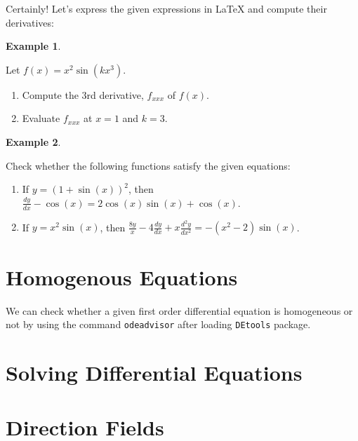 \documentclass[
]{book}
\providecommand{\tightlist}{%
  \setlength{\itemsep}{0pt}\setlength{\parskip}{0pt}}
\theoremstyle{definition}
\theoremstyle{definition}
\newtheorem{example}{Example}[chapter]
\theoremstyle{definition}
\theoremstyle{definition}
\theoremstyle{remark}
\begin{document}
Certainly! Let's express the given expressions in LaTeX and compute their derivatives:

\begin{example}
\protect\hypertarget{exm:unnamed-chunk-37}{}\label{exm:unnamed-chunk-37}

Let \(f(x) = x^2 \sin(kx^3)\).

\begin{enumerate}
\def\labelenumi{(\roman{enumi})}
\tightlist
\item
  Compute the 3rd derivative, \(f_{xxx}\) of \(f(x)\).
\item
  Evaluate \(f_{xxx}\) at \(x = 1\) and \(k = 3\).
\end{enumerate}

\end{example}

\begin{example}
\protect\hypertarget{exm:unnamed-chunk-38}{}\label{exm:unnamed-chunk-38}

Check whether the following functions satisfy the given equations:

\begin{enumerate}
\def\labelenumi{(\roman{enumi})}
\tightlist
\item
  If \(y = {(1 + \sin(x))^2}\), then \(\frac{dy}{dx} - \cos(x) = 2\cos(x)\sin(x) + \cos(x)\).
\item
  If \(y = x^2 \sin(x)\), then \(\frac{8y}{x} - 4\frac{dy}{dx} + x\frac{d^2y}{dx^2} = -(x^2 - 2)\sin(x)\).
\end{enumerate}

\end{example}

\section{Homogenous Equations}\label{homogenous-equations}

We can check whether a given first order differential equation is homogeneous or not by using the command \texttt{odeadvisor} after loading \texttt{DEtools} package.

\section{Solving Differential Equations}\label{solving-differential-equations}

\section{Direction Fields}\label{direction-fields}
\end{document}
